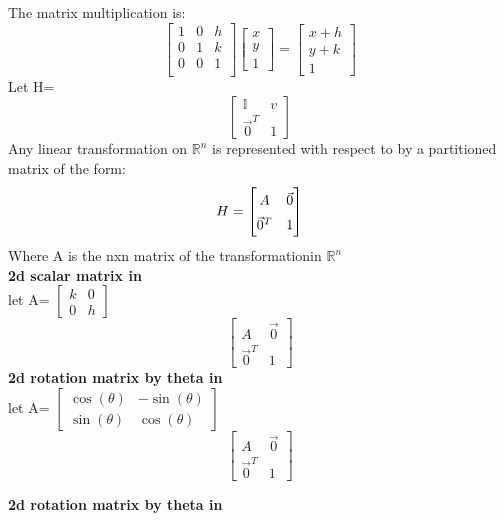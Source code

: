 \documentclass[12pt]{article}
\newcommand{\R}{\mathbb{R}}
\begin{document}
The matrix multiplication is:
\[
\begin{bmatrix}
1&0&h\\
0&1&k\\
0&0&1\\
\end{bmatrix}
\begin{bmatrix}
  x\\y\\1
\end{bmatrix}=
\begin{bmatrix}
  x+h\\y+k\\1
\end{bmatrix}
\]
Let H=
\[
\begin{bmatrix}
\mathbb{I} &v\\
\vec{0}^T & 1
\end{bmatrix}
\]
Any linear transformation on $\R^n$ is represented with respect to
\hg by a partitioned matrix of the form:
\[
H=
\renewcommand{\arraystretch}{1.5}
\begin{bmatrix}
A &\vec{0}\\
\vec{0}^T & 1
\end{bmatrix}
\]
Where A is the nxn matrix of the transformationin $\R^n$\\

\textbf{2d scalar matrix in \hg}
\\
let A= $\begin{bmatrix}
  k&0\\0&h
\end{bmatrix}$
\[
\renewcommand{\arraystretch}{1.5}
\begin{bmatrix}
A &\vec{0}\\
\vec{0}^T & 1
\end{bmatrix}
\]
\textbf{2d rotation matrix by theta in \hg}
\\
let A= $\begin{bmatrix}
  \cos(\theta)&-\sin(\theta)\\\sin(\theta)&\cos(\theta)
\end{bmatrix}$
\[
\renewcommand{\arraystretch}{1.5}
\begin{bmatrix}
A &\vec{0}\\
\vec{0}^T & 1
\end{bmatrix}
\]

\textbf{2d rotation matrix by theta in \hg}
\\
\end{document}

